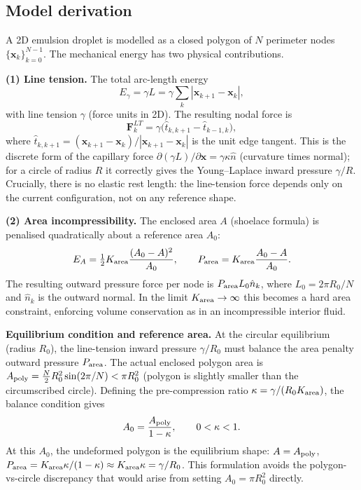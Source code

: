 \documentclass[aps,pre,twocolumn,floatfix,longbibliography]{revtex4-2}
\begin{document}
\subsection{Model derivation}
\label{sec:emulsion_derivation}

A 2D emulsion droplet is modelled as a closed polygon of $N$ perimeter nodes
$\{\mathbf{x}_k\}_{k=0}^{N-1}$.  The mechanical energy has two physical contributions.

\textbf{(1) Line tension.}  The total arc-length energy
\begin{equation}
  E_\gamma = \gamma L = \gamma \sum_k |\mathbf{x}_{k+1} - \mathbf{x}_k|,
\end{equation}
with line tension $\gamma$ (force units in 2D).  The resulting nodal force is
\begin{equation}
  \mathbf{F}_k^{LT} = \gamma\bigl(\hat{t}_{k,k+1} - \hat{t}_{k-1,k}\bigr),
  \label{eq:line_tension}
\end{equation}
where $\hat{t}_{k,k+1} = (\mathbf{x}_{k+1}-\mathbf{x}_k)/|\mathbf{x}_{k+1}-\mathbf{x}_k|$
is the unit edge tangent.  This is the discrete form of the capillary force
$\partial(\gamma L)/\partial \mathbf{x} = \gamma \kappa \hat{n}$ (curvature times normal);
for a circle of radius $R$ it correctly gives the Young--Laplace inward pressure
$\gamma/R$.  Crucially, there is no elastic rest length: the line-tension force depends
only on the current configuration, not on any reference shape.

\textbf{(2) Area incompressibility.}  The enclosed area $A$ (shoelace formula) is
penalised quadratically about a reference area $A_0$:
\begin{equation}
  E_A = \tfrac{1}{2} K_{\rm area} \frac{(A_0 - A)^2}{A_0},
  \qquad
  P_{\rm area} = K_{\rm area}\frac{A_0 - A}{A_0}.
  \label{eq:area_penalty}
\end{equation}
The resulting outward pressure force per node is $P_{\rm area} L_0 \hat{n}_k$,
where $L_0 = 2\pi R_0/N$ and $\hat{n}_k$ is the outward normal.  In the limit
$K_{\rm area} \to \infty$ this becomes a hard area constraint, enforcing volume
conservation as in an incompressible interior fluid.

\textbf{Equilibrium condition and reference area.}  At the circular equilibrium
(radius $R_0$), the line-tension inward pressure $\gamma/R_0$ must balance the area
penalty outward pressure $P_{\rm area}$.  The actual enclosed polygon area is
$A_{\rm poly} = \tfrac{N}{2}R_0^2\sin(2\pi/N) < \pi R_0^2$ (polygon is slightly
smaller than the circumscribed circle).  Defining the pre-compression ratio
$\kappa = \gamma/(R_0 K_{\rm area})$, the balance condition gives
\begin{equation}
  A_0 = \frac{A_{\rm poly}}{1 - \kappa}, \qquad 0 < \kappa < 1.
  \label{eq:A0_formula}
\end{equation}
At this $A_0$, the undeformed polygon is the equilibrium shape: $A = A_{\rm poly}$,
$P_{\rm area} = K_{\rm area}\kappa/(1-\kappa) \approx K_{\rm area}\kappa = \gamma/R_0$.
This formulation avoids the polygon-vs-circle discrepancy that would arise from setting
$A_0 = \pi R_0^2$ directly.
\end{document}
